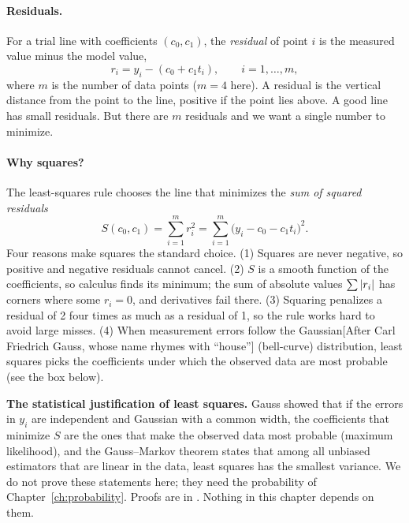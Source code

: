\paragraph{Residuals.} For a trial line with coefficients $(c_0,c_1)$, the \emph{residual} of point $i$ is the measured value minus the model value,
\begin{equation}
r_i = y_i - (c_0 + c_1 t_i), \qquad i=1,\dots,m,
\label{eq:least-squares-resid-line}
\end{equation}
where $m$ is the number of data points ($m=4$ here). A residual is the vertical distance from the point to the line, positive if the point lies above. A good line has small residuals. But there are $m$ residuals and we want a single number to minimize.

\paragraph{Why squares?} The least-squares rule chooses the line that minimizes the \emph{sum of squared residuals}
\begin{equation}
S(c_0,c_1) = \sum_{i=1}^{m} r_i^2 = \sum_{i=1}^m \bigl(y_i - c_0 - c_1 t_i\bigr)^2 .
\label{eq:least-squares-S-line}
\end{equation}
Four reasons make squares the standard choice. (1) Squares are never negative, so positive and negative residuals cannot cancel. (2) $S$ is a smooth function of the coefficients, so calculus finds its minimum; the sum of absolute values $\sum\left\lvert r_i\right\rvert$ has corners where some $r_i=0$, and derivatives fail there. (3) Squaring penalizes a residual of 2 four times as much as a residual of 1, so the rule works hard to avoid large misses. (4) When measurement errors follow the Gaussian[After Carl Friedrich Gauss, whose name rhymes with ``house''] (bell-curve) distribution, least squares picks the coefficients under which the observed data are most probable (see the box below).

\begin{beyond}
\textbf{The statistical justification of least squares.} Gauss showed that if the errors in $y_i$ are independent and Gaussian with a common width, the coefficients that minimize $S$ are the ones that make the observed data most probable (maximum likelihood), and the Gauss--Markov theorem states that among all unbiased estimators that are linear in the data, least squares has the smallest variance. We do not prove these statements here; they need the probability of Chapter~\ref{ch:probability}. Proofs are in \cite{esl}. Nothing in this chapter depends on them.
\end{beyond}

